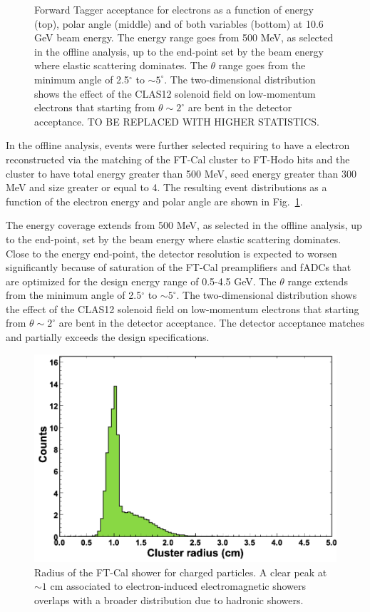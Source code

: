 \begin{figure}[ht]
\begin{center}
\end{center}
\caption{Forward Tagger acceptance for electrons as a function of energy (top), polar angle (middle) and of both variables (bottom) at 10.6 GeV beam energy. The energy range goes from 500 MeV, as selected in the offline analysis, up to the end-point set by the beam energy where elastic scattering dominates. The $\theta$ range goes from the minimum angle of 2.5$^\circ$ to $\sim5^\circ$. The two-dimensional distribution shows the effect of the CLAS12 solenoid field on low-momentum electrons that starting from $\theta\sim2^\circ$ are bent in the detector acceptance. TO BE REPLACED WITH HIGHER STATISTICS.}
\label{fig:ft_acceptance}
\end{figure}
In the offline analysis, events were further selected requiring to have a electron reconstructed via the matching of the FT-Cal cluster to FT-Hodo hits and the cluster to have total energy greater than 500 MeV, seed energy greater than 300 MeV and size greater or equal to 4. The resulting event distributions as a function of the electron energy and polar angle are shown in Fig.~\ref{fig:ft_acceptance}. 

The energy coverage extends from 500 MeV, as selected in the offline analysis, up to the end-point, set by the beam energy where elastic scattering dominates. Close to the energy end-point, the detector resolution is expected to worsen significantly because of saturation of the FT-Cal preamplifiers and fADCs that are optimized for the design energy range of 0.5-4.5 GeV. The $\theta$ range extends from the minimum angle of 2.5$^\circ$ to $\sim5^\circ$. The two-dimensional distribution shows the effect of the CLAS12 solenoid field on low-momentum electrons that starting from $\theta\sim2^\circ$ are bent in the detector acceptance. The detector acceptance matches and partially exceeds the design specifications. 

\begin{figure}[h]
\includegraphics[height=0.65\columnwidth]{fig/ft_shower.png}
\caption{Radius of the FT-Cal shower for charged particles. A clear peak at $\sim 1$ cm associated to electron-induced electromagnetic showers overlaps with a broader distribution due to hadronic showers.}
\label{fig:ft_shower}
\end{figure}
